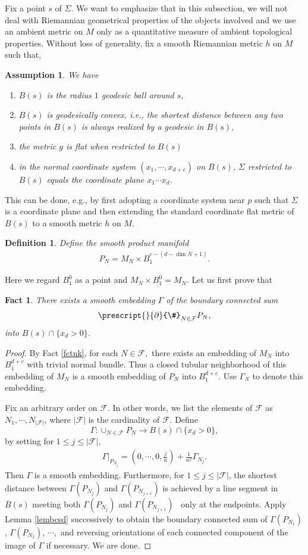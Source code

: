 \documentclass[11pt,a4paper]{amsart}
\numberwithin{equation}{section}
\newcommand{\Ga}{\Gamma}
\newcommand{\Si}{\Sigma}
\newcommand{\cd}{\cdots}
\newcommand{\pd}{\partial}
\theoremstyle{plain}
\newtheorem{fact}[exam]{Fact}
\newtheorem{assump}[exam]{Assumption}
\newtheorem{defn}[exam]{Definition}
\theoremstyle{definition}
\numberwithin{equation}{subsection}
\begin{document}
	Fix a point $s$ of $\Si$. We want to emphasize that in this subsection, we will not deal with Riemannian geometrical properties of the objects involved and we use an ambient metric on $M$ only as a quantitative measure of ambient topological properties. Without loss of generality, fix a smooth Riemannian metric $h $ on $M$ such that,
	\begin{assump}We have\label{assumpcb}
		\begin{enumerate}
			\item $B(s)$ is the radius $1$ geodesic ball around $s$,
			\item $B(s)$ is geodesically convex, i.e., the shortest distance between any two points in $B(s)$ is always realized by a geodesic in $B(s),$
			\item the metric $g$ is flat when restricted to $B(s)$
			\item in the normal coordinate system $(x_1,\cd,x_{d+c})$ on $B(s)$, $\Si$ restricted to $B(s)$ equals the coordinate plane $x_1\cd x_d.$  		 
		\end{enumerate}
	\end{assump} 
	This can be done, e.g., by first adopting a coordinate system near $p$ such that $\Si$ is a coordinate plane and then extending the standard coordinate flat metric of $B(s)$ to a smooth metric $h$ on $M$.
	\begin{defn}
		Define the smooth product manifold 
		\begin{align*}
			P_N=M_N\times B_1^{c-(d-\dim N+1)}.
		\end{align*}
	\end{defn}Here we regard $B_1^0$ as a point and $M_N\times B_1^0=M_N.$
	Let us first prove that
	\begin{fact}
		There exists a smooth embedding $\Ga$ of the boundary connected sum $$\prescript{}{\pd}{\#}_{N\in\mathcal{F}}P_N,$$ into $B(s)\cap \{x_{d}>0\}$.
	\end{fact}
	\begin{proof}
		By Fact \ref{fctnk}, for each $N\in\mathcal{F},$ there exists an embedding of $M_N$ into $B_1^{d+c}$ with trivial normal bundle. Thus a closed tubular neighborhood of this embedding of $M_N$ is a smooth embedding of $P_N$ into
		$B_1^{d+c}.$ Use $\Ga_N$ to denote this embedding.
		
		Fix an arbitrary order on $\mathcal{F}$. In other words, we list the elements of $\mathcal{F}$ as $N_1,\cd,N_{|\mathcal{F}|}$, where $|\mathcal{F}|$ is the cardinality of $\mathcal{F}.$ Define $$
		\Ga:\cup_{N\in\mathcal{F}}P_N\to B(s)\cap\{x_d>0\},$$ by setting for $1\le j\le|\mathcal{F}|,$
		\begin{align*}
			\Ga|_{P_{N_j}}=\left(0,\cd,0,\frac{j}{n}\right)+\frac{1}{n^2}\Ga_{N_j}.
		\end{align*}
		Then $\Ga$ is a smooth embedding. Furthermore, for $1\le j\le |\mathcal{F}|$, the shortest distance between $\Ga(P_{N_j})$ and $\Ga(P_{N_{j+1}})$ is achieved by a line segment in $B(s)$ meeting both $\Ga(P_{N_j})$ and $\Ga(P_{N_{j+1}})$  only at the endpoints. Apply Lemma \ref{lembcsd} successively to obtain the boundary connected sum of $\Ga(P_{N_1})$, $\Ga(P_{N_2})$, $\cd,$ and reversing orientations of each connected component of the image of $\Ga$ if necessary. We are done.
	\end{proof}
\end{document}
